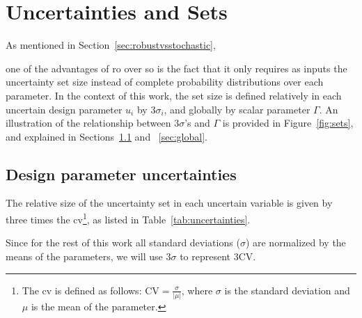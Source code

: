 \section{Uncertainties and Sets}
\label{uncertainties_and_sets}

As mentioned in Section~\ref{sec:robustvsstochastic}, {\color{blue}one of the advantages
of \gls{ro} over \gls{so} is the fact that it only requires as inputs
the uncertainty set size instead of complete probability distributions
over each parameter.
In the context of this work, the set size is defined relatively in each
uncertain design parameter $u_i$ by $3\sigma_i$, and globally by scalar parameter
$\Gamma$. An illustration of the relationship between $3\sigma$'s and $\Gamma$
is provided in Figure~\ref{fig:sets}, and explained in Sections~\ref{sec:relative} and ~\ref{sec:global}.

\subsection{Design parameter uncertainties}
\label{sec:relative}

The relative size of the uncertainty set in each uncertain variable is
given by three times the \gls{cv}\footnote{The \gls{cv}
is defined as follows: $\text{CV} = \frac{\sigma}{|\mu|}$,
where $\sigma$ is the standard deviation and $\mu$ is the mean of the parameter.},
as listed in Table~\ref{tab:uncertainties}.} Since for the rest of this work
all standard deviations ($\sigma$) are normalized by the means of the parameters, we will use $3\sigma$
to represent $3\text{CV}$.

